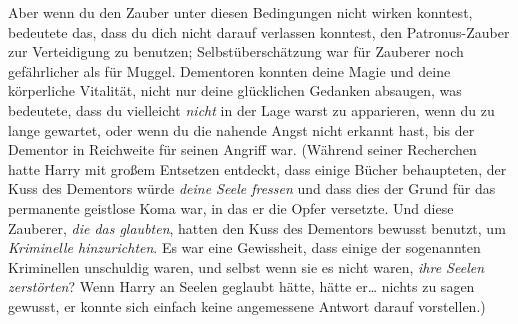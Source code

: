 Aber wenn du den Zauber unter diesen Bedingungen nicht wirken konntest, bedeutete das, dass du dich nicht darauf verlassen konntest, den Patronus-Zauber zur Verteidigung zu benutzen; Selbstüberschätzung war für Zauberer noch gefährlicher als für Muggel. Dementoren konnten deine Magie und deine körperliche Vitalität, nicht nur deine glücklichen Gedanken absaugen, was bedeutete, dass du vielleicht \emph{nicht} in der Lage warst zu apparieren, wenn du zu lange gewartet, oder wenn du die nahende Angst nicht erkannt hast, bis der Dementor in Reichweite für seinen Angriff war. (Während seiner Recherchen hatte Harry mit großem Entsetzen entdeckt, dass einige Bücher behaupteten, der Kuss des Dementors würde \emph{deine Seele fressen} und dass dies der Grund für das permanente geistlose Koma war, in das er die Opfer versetzte. Und diese Zauberer, \emph{die das glaubten}, hatten den Kuss des Dementors bewusst benutzt, um \emph{Kriminelle hinzurichten}. Es war eine Gewissheit, dass einige der sogenannten Kriminellen unschuldig waren, und selbst wenn sie es nicht waren, \emph{ihre Seelen zerstörten}? Wenn Harry an Seelen geglaubt hätte, hätte er… nichts zu sagen gewusst, er konnte sich einfach keine angemessene Antwort darauf vorstellen.)

